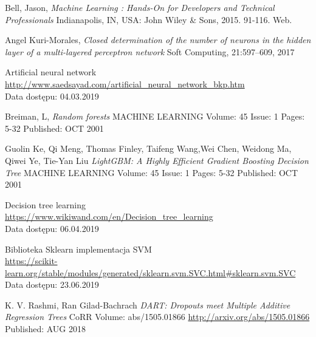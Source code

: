\documentclass[a4paper, twoside, 11pt, openright]{article}
\begin{document}
\begin{thebibliography}{9}
	Bell, Jason, \textit{Machine Learning : Hands-On for Developers and Technical Professionals}  Indianapolis, IN, USA: John Wiley \& Sons, 2015. 91-116. Web.


	Angel Kuri-Morales, 
  \textit{Closed determination of the number of neurons in the hidden layer of a multi-layered perceptron network}
  Soft Computing, 21:597–609, 2017

	Artificial neural network
	\\\url{http://www.saedsayad.com/artificial_neural_network_bkp.htm} 
	\\Data dostępu: 04.03.2019

	Breiman, L, 
  \textit{Random forests}
	MACHINE LEARNING  Volume: 45   Issue: 1   Pages: 5-32   Published: OCT 2001

Guolin Ke, Qi Meng, Thomas Finley, Taifeng Wang,Wei Chen, Weidong Ma, Qiwei Ye, Tie-Yan Liu
  \textit{LightGBM: A Highly Efficient Gradient Boosting Decision Tree}
	MACHINE LEARNING  Volume: 45   Issue: 1   Pages: 5-32   Published: OCT 2001

	Decision tree learning
	\\\url{https://www.wikiwand.com/en/Decision_tree_learning} 
	\\Data dostępu: 06.04.2019

	Biblioteka Sklearn implementacja SVM
	\\\url{https://scikit-learn.org/stable/modules/generated/sklearn.svm.SVC.html#sklearn.svm.SVC}
	\\Data dostępu: 23.06.2019

	K. V. Rashmi, Ran Gilad-Bachrach
	\textit{DART: Dropouts meet Multiple Additive Regression Trees}
	CoRR Volume: abs/1505.01866 \url{http://arxiv.org/abs/1505.01866} Published: AUG 2018

\end{thebibliography}

\newpage


\listoffigures

\newpage 


\listoftables

\newpage
\end{document}
